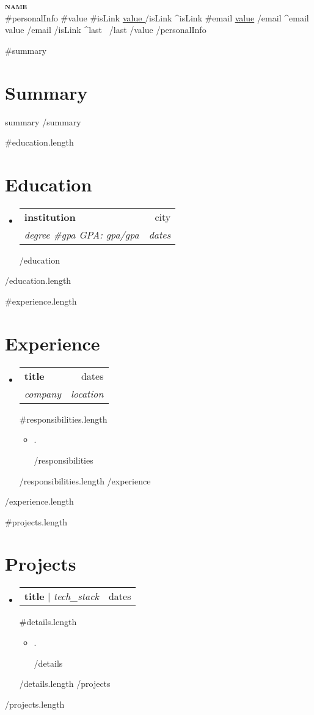 \documentclass[letterpaper,11pt]{article}
\newcommand{\resumeItem}[1]{
  \item\small{
    {#1 \vspace{-2pt}}
  }
}
\newcommand{\resumeSubheading}[4]{
  \vspace{-2pt}\item
    \begin{tabularx}{\textwidth}{Xr}
      \textbf{#1} & #2 \\
      \textit{\small#3} & \textit{\small #4} \\
    \end{tabularx}\vspace{-6pt}
}
\newcommand{\resumeProjectHeading}[2]{
    \item
    \begin{tabularx}{\textwidth}{Xr}
      \small #1 & #2 \\
    \end{tabularx}\vspace{-6pt}
}
\newcommand{\resumeSubHeadingListStart}{
  \begin{itemize}[leftmargin=0.15in, label={}, itemsep=3pt, parsep=0pt, topsep=0pt]
}
\newcommand{\resumeSubHeadingListEnd}{\end{itemize}}
\newcommand{\resumeItemListStart}{
  \begin{itemize}[itemsep=2pt, parsep=0pt, topsep=0pt]
}
\newcommand{\resumeItemListEnd}{\end{itemize}\vspace{-8pt}}
\begin{document}
\begin{center}
    \textbf{\Huge \scshape {{name}}} \\ \vspace{1pt}
    \small
    {{#personalInfo}}
      {{#value}}
        {{#isLink}}
          \href{ {{{link}}} }{ \underline{ {{value}} } }
        {{/isLink}}
        {{^isLink}}
          {{#email}}
            \underline{{{value}}}
          {{/email}}
          {{^email}}
            {{value}}
          {{/email}}
        {{/isLink}}
        {{^last}} \textbar\ {{/last}}
      {{/value}}
    {{/personalInfo}}
\end{center}

{{#summary}}
\section{Summary}
{{summary}}
{{/summary}}

{{#education.length}}
\section{Education}
\resumeSubHeadingListStart
  {{#education}}
    \resumeSubheading
      { {{institution}} }{ {{city}} }
      { {{degree}} {{#gpa}} GPA: {{gpa}}{{/gpa}} }{ {{dates}} }
  {{/education}}
\resumeSubHeadingListEnd
{{/education.length}}

{{#experience.length}}
\section{Experience}
\resumeSubHeadingListStart
  {{#experience}}
    \resumeSubheading
      { {{title}} }{ {{dates}} }
      { {{company}} }{ {{location}} }
      {{#responsibilities.length}}
      \resumeItemListStart
        {{#responsibilities}}
          \resumeItem{ {{.}} }
        {{/responsibilities}}
      \resumeItemListEnd
      {{/responsibilities.length}}
  {{/experience}}
\resumeSubHeadingListEnd
{{/experience.length}}

{{#projects.length}}
\section{Projects}
\resumeSubHeadingListStart
  {{#projects}}
    \resumeProjectHeading
      { \textbf{ {{title}} } $|$ \emph{ {{tech_stack}} } }{ {{dates}} }
      {{#details.length}}
      \resumeItemListStart
        {{#details}}
          \resumeItem{ {{.}} }
        {{/details}}
      \resumeItemListEnd
      {{/details.length}}
  {{/projects}}
\resumeSubHeadingListEnd
{{/projects.length}}
\end{document}
